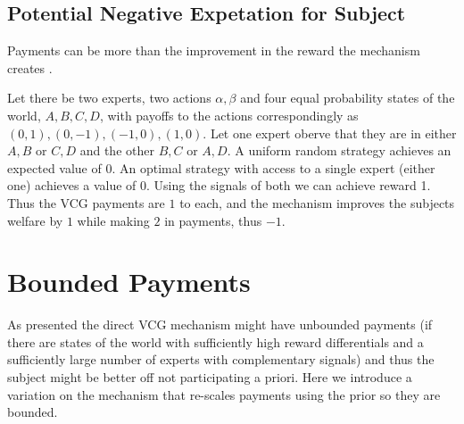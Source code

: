 \subsection{Potential Negative Expetation for Subject}
Payments can be more than the improvement in the reward the mechanism creates . 


\begin{eg}
	Let there be two experts, two actions ${\alpha,\beta}$ and four equal probability states of the world, ${A,B,C,D}$, with payoffs to the actions correspondingly as ${(0,1),(0,-1),(-1,0),(1,0)}$. Let one expert oberve that they are in either ${A,B}$ or ${C,D}$ and the other ${B,C}$ or ${A,D}$. A uniform random strategy achieves an expected value of 0. An optimal strategy with access to a single expert (either one) achieves a value of 0. Using the signals of both we can achieve reward 1. Thus the VCG payments are $1$ to each, and the mechanism improves the subjects welfare by $1$ while making $2$ in payments, thus $-1$. 
\end{eg}




\section{Bounded Payments}
As presented the direct VCG mechanism might have unbounded payments (if there are states of the world with sufficiently high reward differentials and a sufficiently large number of experts with complementary signals) and thus the subject might be better off not participating a priori. Here we introduce a variation on the mechanism that re-scales payments using the prior so they are bounded.





